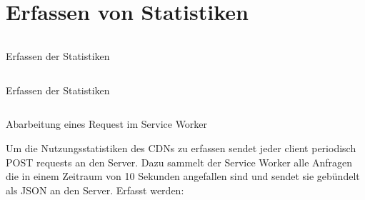 \section{Erfassen von Statistiken}\label{ch:implementation:stats}
\begin{listing}[h]
	\inputminted{javascript}{listings/sendStatistic.js}
	\caption{Erfassen der Statistiken}
	\label{lst:code-stats}
\end{listing}
\begin{listing}[h]
	\inputminted{javascript}{listings/logStatistic.js}
	\caption{Erfassen der Statistiken}
	\label{lst:code-stats}
\end{listing}
\begin{listing}[h]
	\inputminted{javascript}{listings/handle_request.js}
	\caption{Abarbeitung eines Request im Service Worker}
	\label{lst:handle_request}
\end{listing}

Um die Nutzungsstatistiken des CDNs zu erfassen sendet jeder client periodisch POST requests an den Server. Dazu sammelt der Service Worker alle Anfragen die in einem Zeitraum von 10 Sekunden angefallen sind und sendet sie gebündelt als JSON an den Server.
Erfasst werden:

